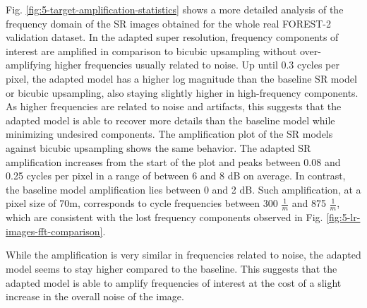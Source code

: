         Fig. \ref{fig:5-target-amplification-statistics} shows a more detailed analysis of the frequency domain of the SR images obtained for the whole real FOREST-2 validation dataset.
        In the adapted super resolution, frequency components of interest are amplified in comparison to bicubic upsampling without over-amplifying higher frequencies usually related to noise. Up until 0.3 cycles per pixel, the adapted model has a higher log magnitude than the baseline SR model or bicubic upsampling, also staying slightly higher in high-frequency components.
        As higher frequencies are related to noise and artifacts, this suggests that the adapted model is able to recover more details than the baseline model while minimizing undesired components.
        The amplification plot of the SR models against bicubic upsampling shows the same behavior. 
        The adapted SR amplification increases from the start of the plot and peaks between 0.08 and 0.25 cycles per pixel in a range of between 6 and 8 dB on average. In contrast, the baseline model amplification lies between 0 and 2 dB.
        Such amplification, at a pixel size of 70m, corresponds to cycle frequencies between  300 $\frac{1}{m}$ and 875 $\frac{1}{m}$, which are consistent with the lost frequency components observed in Fig. \ref{fig:5-lr-images-fft-comparison}.
        
        While the amplification is very similar in frequencies related to noise, the adapted model seems to stay higher compared to the baseline.  
        This suggests that the adapted model is able to amplify frequencies of interest at the cost of a slight increase in the overall noise of the image.

